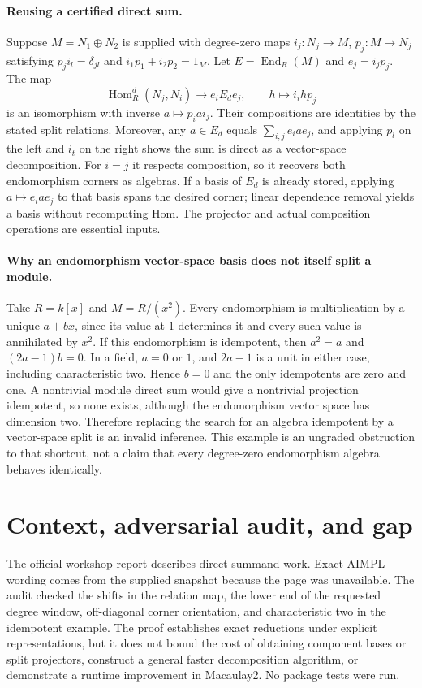 \documentclass[11pt]{article}
\begin{document}
\paragraph{Reusing a certified direct sum.}
Suppose $M=N_1\oplus N_2$ is supplied with degree-zero maps
$i_j:N_j\to M$, $p_j:M\to N_j$ satisfying
$p_j i_l=\delta_{jl}$ and $i_1p_1+i_2p_2=1_M$.
Let $E=\operatorname{End}_R(M)$ and $e_j=i_jp_j$. The map
\[
\operatorname{Hom}_R^d(N_j,N_i)\longrightarrow e_i E_d e_j,
\qquad h\longmapsto i_i h p_j
\]
is an isomorphism with inverse $a\mapsto p_i a i_j$.
Their compositions are identities by the stated split relations. Moreover,
any $a\in E_d$ equals $\sum_{i,j}e_i a e_j$, and applying $p_l$ on the
left and $i_t$ on the right shows the sum is direct as a vector-space
 decomposition. For $i=j$ it respects composition, so it recovers both
endomorphism corners as algebras. If a basis of $E_d$ is already stored,
applying $a\mapsto e_i a e_j$ to that basis spans the desired corner;
linear dependence removal yields a basis without recomputing Hom.
The projector and actual composition operations are essential inputs.

\paragraph{Why an endomorphism vector-space basis does not itself split a module.}
Take $R=k[x]$ and $M=R/(x^2)$. Every endomorphism is multiplication by a
unique $a+bx$, since its value at $1$ determines it and every such value is
annihilated by $x^2$. If this endomorphism is idempotent, then
$a^2=a$ and $(2a-1)b=0$. In a field, $a=0$ or $1$, and $2a-1$ is a
unit in either case, including characteristic two. Hence $b=0$ and the
only idempotents are zero and one. A nontrivial module direct sum would
give a nontrivial projection idempotent, so none exists, although the
endomorphism vector space has dimension two. Therefore replacing the search
for an algebra idempotent by a vector-space split is an invalid inference.
This example is an ungraded obstruction to that shortcut, not a claim that
every degree-zero endomorphism algebra behaves identically.

\section{Context, adversarial audit, and gap}
The official workshop report describes direct-summand work. Exact AIMPL
wording comes from the supplied snapshot because the page was unavailable.
The audit checked the shifts in the relation map, the lower end of the
requested degree window, off-diagonal corner orientation, and characteristic
two in the idempotent example. The proof establishes exact reductions under
explicit representations, but it does not bound the cost of obtaining component
bases or split projectors, construct a general faster decomposition algorithm,
or demonstrate a runtime improvement in Macaulay2. No package tests were run.
\end{document}
